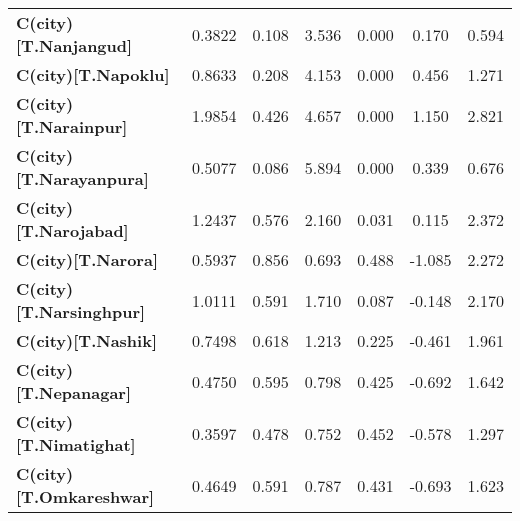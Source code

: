 \begin{center}
\begin{tabular}{lcccccc}
\textbf{C(city)[T.Nanjangud]}                                                                       &       0.3822  &        0.108     &     3.536  &         0.000        &        0.170    &        0.594     \\
\textbf{C(city)[T.Napoklu]}                                                                         &       0.8633  &        0.208     &     4.153  &         0.000        &        0.456    &        1.271     \\
\textbf{C(city)[T.Narainpur]}                                                                       &       1.9854  &        0.426     &     4.657  &         0.000        &        1.150    &        2.821     \\
\textbf{C(city)[T.Narayanpura]}                                                                     &       0.5077  &        0.086     &     5.894  &         0.000        &        0.339    &        0.676     \\
\textbf{C(city)[T.Narojabad]}                                                                       &       1.2437  &        0.576     &     2.160  &         0.031        &        0.115    &        2.372     \\
\textbf{C(city)[T.Narora]}                                                                          &       0.5937  &        0.856     &     0.693  &         0.488        &       -1.085    &        2.272     \\
\textbf{C(city)[T.Narsinghpur]}                                                                     &       1.0111  &        0.591     &     1.710  &         0.087        &       -0.148    &        2.170     \\
\textbf{C(city)[T.Nashik]}                                                                          &       0.7498  &        0.618     &     1.213  &         0.225        &       -0.461    &        1.961     \\
\textbf{C(city)[T.Nepanagar]}                                                                       &       0.4750  &        0.595     &     0.798  &         0.425        &       -0.692    &        1.642     \\
\textbf{C(city)[T.Nimatighat]}                                                                      &       0.3597  &        0.478     &     0.752  &         0.452        &       -0.578    &        1.297     \\
\textbf{C(city)[T.Omkareshwar]}                                                                     &       0.4649  &        0.591     &     0.787  &         0.431        &       -0.693    &        1.623     \\

\end{tabular}
\end{center}
